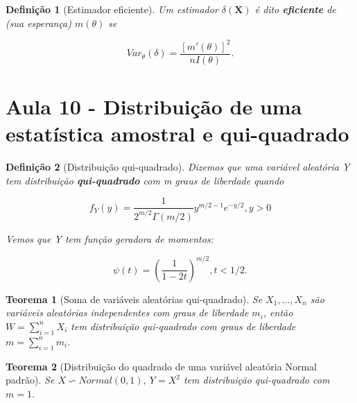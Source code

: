 \documentclass{article}
\newtheorem{theorem}{Teorema}
\newtheorem{definition}{Definição}
\begin{document}
\begin{definition}[Estimador eficiente]
Um estimador $\delta(\textbf{X})$ é dito \textbf{eficiente} de (sua esperança) $m(\theta)$ se

$$Var_\theta(\delta) = \frac{[m'(\theta)]^2}{n I(\theta)}.$$
\end{definition}

\section*{Aula 10 - Distribuição de uma estatística amostral e qui-quadrado}

\begin{definition}[Distribuição qui-quadrado]
Dizemos que uma variável aleatória Y tem distribuição \textbf{qui-quadrado} com m graus de liberdade quando

\begin{equation}
    f_Y(y) = \frac{1}{2^{m/2} \Gamma(m/2)} y^{m/2 - 1} e^{-y/2}, y > 0
\end{equation}

Vemos que Y tem função geradora de momentos:

$$\psi (t) = \left ( \frac{1}{1 - 2t} \right )^{m/2}, t < 1/2.$$
\end{definition}

\begin{theorem}[Soma de variáveis aleatórias qui-quadrado]
Se $X_1, \ldots, X_n$ são variáveis aleatórias independentes com graus de liberdade $m_i$, então $W = \sum_{i = 1}^n X_i$ tem distribuição qui-quadrado com graus de liberdade $m = \sum_{i = 1}^n m_i$.
\end{theorem}

\begin{theorem}[Distribuição do quadrado de uma variável aleatória Normal padrão]
Se $X \backsim Normal(0, 1), \ Y = X^2$ tem distribuição qui-quadrado com $m = 1$.
\end{theorem}
\end{document}
